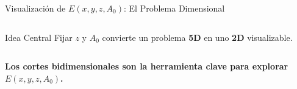 \begin{frame}{Visualización de $E(x,y,z,A_0)$: El Problema Dimensional}
\begin{columns}[T]
        \vspace{0.2cm}

        \begin{block}{Idea Central}
            \centering
            \scriptsize
            Fijar $z$ y $A_0$ convierte un problema \textbf{5D} en uno \textbf{2D} visualizable.
        \end{block}

    \end{columns}

    \vspace{0.2cm}
    \begin{center}
        \footnotesize
        \textbf{Los cortes bidimensionales son la herramienta clave para explorar $E(x,y,z,A_0)$.}
    \end{center}

\end{frame}
